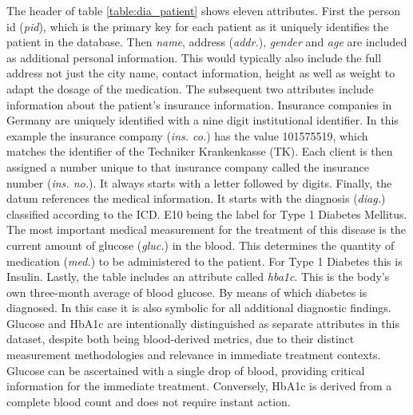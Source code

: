 The header of table \ref{table:dia_patient} shows eleven attributes. First the person id (\textit{pid}), which is the primary key for each patient as it uniquely identifies the patient in the database. Then \textit{name}, address (\textit{addr.}), \textit{gender} and \textit{age} are included as additional personal information.
This would typically also include the full address not just the city name, contact information, height as well as weight to adapt the dosage of the medication. The subsequent two attributes include information about the patient's insurance information. 
Insurance companies in Germany are uniquely identified with a nine digit institutional identifier. In this example the insurance company (\textit{ins. co.}) has the value 101575519, which matches the identifier of the Techniker Krankenkasse (TK). 
Each client is then assigned a number unique to that insurance company called the insurance number (\textit{ins. no.}). It always starts with a letter followed by digits. Finally, the datum references the medical information. It starts with the diagnosis (\textit{diag.}) classified according to the \ac*{ICD}. 
E10 being the label for Type 1 Diabetes Mellitus. The most important medical measurement for the treatment of this disease is the current amount of glucose (\textit{gluc.}) in the blood. This determines the quantity of medication (\textit{med.}) to be administered to the patient. For Type 1 Diabetes this is Insulin. 
Lastly, the table includes an attribute called \textit{hba1c}. This is the body's own three-month average of blood glucose. By means of which diabetes is diagnosed. In this case it is also symbolic for all additional diagnostic findings. 
Glucose and HbA1c are intentionally distinguished as separate attributes in this dataset, despite both being blood-derived metrics, due to their distinct measurement methodologies and relevance in immediate treatment contexts. Glucose can be ascertained with a single drop of blood, providing critical information for the immediate treatment.
Conversely, HbA1c is derived from a complete blood count and does not require instant action. \newline

